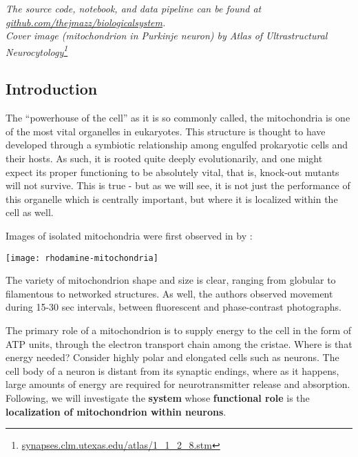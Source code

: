 \maketitle

\begin{center}
\textit{
The source code, notebook, and data pipeline can be found at
\href{https://github.com/thejmazz/biologicalsystem}{github.com/thejmazz/biologicalsystem}. \\
Cover image (mitochondrion in Purkinje neuron) by Atlas of Ultrastructural Neurocytology\footnote{\href{http://synapses.clm.utexas.edu/atlas/1_1_2_8.stm}{synapses.clm.utexas.edu/atlas/1\_1\_2\_8.stm}}
}
\end{center}

\tableofcontents

\begin{bottompar}
\section{Introduction}

The ``powerhouse of the cell'' as it is so commonly called, the mitochondria is
one of the most vital organelles in eukaryotes. This structure is thought to
have developed through a symbiotic relationship among engulfed prokaryotic cells
and their hosts. As such, it is rooted quite deeply evolutionarily, and one
might expect its proper functioning to be absolutely vital, that is, knock-out
mutants will not survive. This is true - but as we will see, it is not just the
performance of this organelle which is centrally important, but where it is
localized within the cell as well.

\end{bottompar}

Images of isolated mitochondria were first observed in \citeyear{Lincoln1979}
by \citeauthor{Lincoln1979}:

\begin{center}
  \texttt{[image: rhodamine-mitochondria]}
\end{center}

\noindent The variety of mitochondrion shape and size is clear, ranging from
globular to filamentous to networked structures. As well, the authors observed
movement during 15-30 sec intervals, between fluorescent and phase-contrast
photographs.

The primary role of a mitochondrion is to supply energy to the cell in the form
of ATP units, through the electron transport chain among the cristae. Where is
that energy needed? Consider highly polar and elongated cells such as neurons.
The cell body of a neuron is distant from its synaptic endings, where as it
happens, large amounts of energy are required for neurotransmitter release and
absorption. Following, we will investigate the \textbf{system} whose
\textbf{functional role} is the \textbf{localization of mitochondrion within
neurons}.

